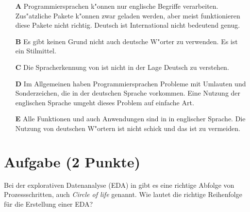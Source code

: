 \documentclass[a4paper, 10pt]{scrartcl}\usepackage[]{graphicx}\usepackage[]{xcolor}
\begin{document}
\begin{enumerate}
\item [\textbf{A} \msquare] Programmiersprachen k{"o}nnen nur englische Begriffe verarbeiten. Zus{"a}tzliche Pakete k{"o}nnen zwar geladen werden, aber meist funktionieren diese Pakete nicht richtig. Deutsch ist International nicht bedeutend genug.
\item [\textbf{B} \msquare] Es gibt keinen Grund nicht auch deutsche W{"o}rter zu verwenden. Es ist ein Stilmittel.
\item [\textbf{C} \msquare] Die Spracherkennung von \Rlogo ist nicht in der Lage Deutsch zu verstehen.
\item [\textbf{D} \msquare] Im Allgemeinen haben Programmiersprachen Probleme mit Umlauten und Sonderzeichen, die in der deutschen Sprache vorkommen. Eine Nutzung der englischen Sprache umgeht dieses Problem auf einfache Art.
\item [\textbf{E} \msquare] Alle Funktionen und auch Anwendungen sind in \Rlogo in englischer Sprache. Die Nutzung von deutschen W{"o}rtern ist nicht schick und das ist zu vermeiden.
\end{enumerate}

\section{Aufgabe \hfill (2 Punkte)}

Bei der explorativen Datenanalyse (EDA) in \Rlogo gibt es eine richtige Abfolge von Prozessschritten, auch \textit{Circle of life} genannt. Wie lautet die richtige Reihenfolge f{\"u}r die Erstellung einer EDA?
\end{document}
